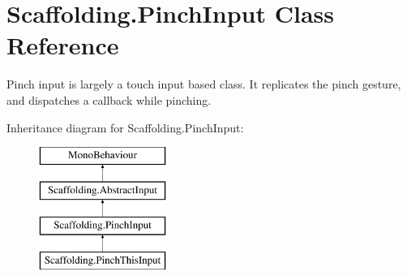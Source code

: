 \hypertarget{class_scaffolding_1_1_pinch_input}{\section{Scaffolding.\-Pinch\-Input Class Reference}
\label{class_scaffolding_1_1_pinch_input}
}


Pinch input is largely a touch input based class. It replicates the pinch gesture, and dispatches a callback while pinching.  


Inheritance diagram for Scaffolding.\-Pinch\-Input\-:\begin{figure}[H]
\begin{center}
\leavevmode
\includegraphics[height=4.000000cm]{class_scaffolding_1_1_pinch_input}
\end{center}
\end{figure}
